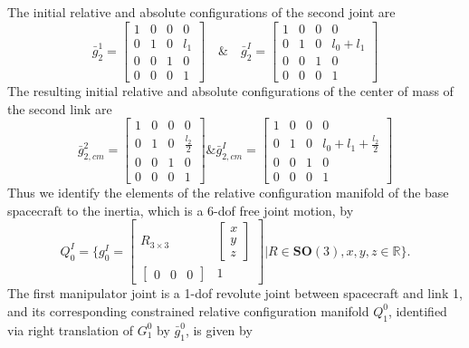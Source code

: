 \documentclass[lettersize,journal]{IEEEtran}
\def \SO {\textbf{SO}(3)}
\theoremstyle{remark}
\begin{document}
The initial relative and absolute configurations of the second joint are
\begin{equation*}
    \bar{g}^1_2=\begin{bmatrix}1 &0 &0&0 \\0 &1 &0& l_1\\0 & 0& 1&0 \\0 & 0 & 0 & 1
    \end{bmatrix} \quad \& \quad \bar{g}^I_2=\begin{bmatrix}1 &0 &0&0 \\0 &1 &0& l_0+l_1\\0 & 0& 1&0 \\0 & 0 & 0 & 1
    \end{bmatrix}
\end{equation*}
The resulting initial relative and absolute configurations of the center of mass of the second link are
\begin{equation*}
    \bar{g}^2_{2,cm}=\begin{bmatrix}1 &0 &0&0 \\0 &1 &0& \frac{l_2}{2}\\0 & 0& 1&0 \\0 & 0 & 0 & 1
    \end{bmatrix}\& \bar{g}^I_{2,cm}=\begin{bmatrix}1 &0 &0&0 \\0 &1 &0& l_0+l_1+\frac{l_2}{2}\\0 & 0& 1&0 \\0 & 0 & 0 & 1
    \end{bmatrix}
\end{equation*}
Thus we identify the elements of the relative configuration manifold of the base spacecraft to the inertia, which is a 6-dof free joint motion, by
\begin{equation}
    Q^I_0=\Bigg\{g^I_0=\begin{bmatrix}
    R_{3 \times 3} & \begin{bmatrix}
    x \\ y \\ z
    \end{bmatrix}\\ \begin{bmatrix}
    0 & 0 & 0
    \end{bmatrix} & 1
    \end{bmatrix}\Bigg| R \in \SO,x,y,z\in\mathbb{R} \Bigg\}.
\end{equation}
The first manipulator joint is a 1-dof revolute joint between spacecraft and link 1, and its corresponding  constrained relative configuration manifold $Q^0_1$, identified via right translation of $G^0_1$ by $\bar{g}^0_1$, is given by
\end{document}
